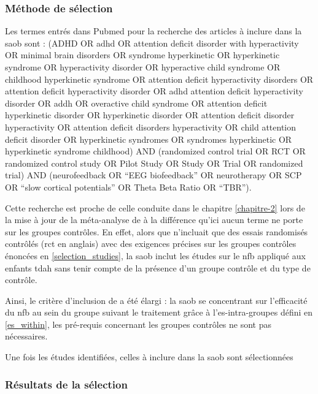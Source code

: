\subsubsection{Méthode de sélection}

Les termes entrés dans Pubmed pour la recherche des articles à inclure dans la \gls{saob} sont :
(ADHD OR adhd OR attention deficit disorder with hyperactivity OR minimal brain disorders OR syndrome hyperkinetic OR hyperkinetic
syndrome OR hyperactivity disorder OR hyperactive child syndrome OR childhood hyperkinetic syndrome OR attention deficit hyperactivity disorders
OR attention deficit hyperactivity disorder OR adhd attention deficit hyperactivity disorder OR addh OR overactive child syndrome OR attention deficit 
hyperkinetic disorder OR hyperkinetic disorder OR attention deficit disorder hyperactivity OR attention deficit disorders hyperactivity OR child 
attention deficit disorder OR hyperkinetic syndromes OR syndromes hyperkinetic OR hyperkinetic syndrome childhood) AND 
(randomized control trial OR RCT OR randomized control study OR Pilot Study OR Study OR Trial OR randomized trial) AND 
(neurofeedback OR “EEG biofeedback” OR neurotherapy OR SCP OR “slow cortical potentials” OR Theta Beta Ratio OR “TBR”). 

Cette recherche est proche de celle conduite dans le chapitre \ref{chapitre-2} lors de la mise à jour de la méta-analyse de \citet{Cortese2016} à la différence
qu'ici aucun terme ne porte sur les groupes contrôles. En effet, alors que \citet{Cortese2016} n'incluait que des essais randomisés contrôlés (\gls{rct} en anglais) 
avec des exigences précises sur les groupes contrôles énoncées en \ref{selection_studies}, la \gls{saob} inclut les études sur le \gls{nfb} appliqué aux enfants 
\gls{tdah} sans tenir compte de la présence d'un groupe contrôle et du type de contrôle. 

Ainsi, le critère d'inclusion de \citet{Cortese2016} a été élargi : la \gls{saob} se concentrant sur l'efficacité du \gls{nfb} au sein du 
groupe suivant le traitement grâce à l'\gls{es}-intra-groupes défini en \ref{es_within}, les pré-requis concernant les groupes contrôles 
ne sont pas nécessaires.

Une fois les études identifiées, celles à inclure dans la \gls{saob} sont sélectionnées

\subsubsection{Résultats de la sélection}

